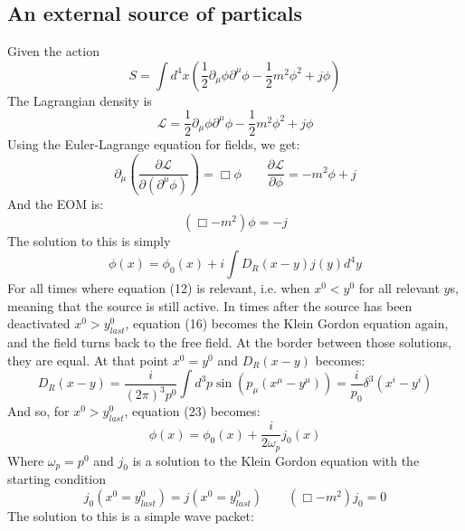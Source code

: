 \documentclass{article}
\begin{document}
\subsection{An external source of particals}
Given the action
\begin{equation}
    S = \int d^4x \left( \frac{1}{2}\partial_\mu\phi\partial^\mu\phi - \frac{1}{2}m^2\phi^2 + j\phi \right)
\end{equation}
The Lagrangian density is
\begin{equation}
    \mathcal{L} = \frac{1}{2}\partial_\mu\phi\partial^\mu\phi - \frac{1}{2}m^2\phi^2 + j\phi
\end{equation}
Using the Euler-Lagrange equation for fields, we get:
\begin{equation}
    \partial_\mu\left(\frac{\partial\mathcal{L}}{\partial\left(\partial^\mu\phi\right)}\right) = \Box \phi
    \qquad
    \frac{\partial \mathcal{L}}{\partial\phi} = -m^2\phi + j
\end{equation}
And the EOM is:
\begin{equation}
    \left(\Box - m^2\right)\phi = -j
\end{equation}
The solution to this is simply
\begin{equation}
    \phi(x) = \phi_0(x) + i \int D_R(x-y)j(y)d^4y
\end{equation}
For all times where equation (12) is relevant, i.e. when $x^0 < y^0$ for all relevant $y$s, meaning that the source is still active. In times after the source has been deactivated $x^0 > y^0_{last}$, equation (16) becomes the Klein Gordon equation again, and the field turns back to the free field. At the border between those solutions, they are equal. At that point $x^0 = y^0$ and $D_R(x - y)$ becomes:
\begin{equation}
    D_R(x - y) = \frac{i}{(2\pi)^3 p^0} \int d^3p
    \sin\left(p_\mu \left(x^\mu - y^\mu\right)\right) = \frac{i}{p_0}\delta^3(x^i - y^i)
\end{equation}
And so, for $x^0 > y^0_{last}$, equation (23) becomes:
\begin{equation}
    \phi(x) = \phi_0(x) + \frac{i}{2 \omega_p}j_0(x)
\end{equation}
Where $\omega_p = p^0$ and $j_0$ is a solution to the Klein Gordon equation with the starting condition
\begin{equation}
    j_0(x^0 = y^0_{last}) = j(x^0 = y^0_{last}) \qquad \left(\Box - m^2\right)j_0 = 0
\end{equation}
The solution to this is a simple wave packet:
\end{document}
